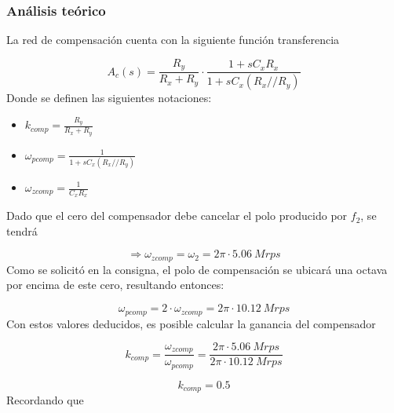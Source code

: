 \documentclass[a4paper,12pt]{article}
\begin{document}
\subsubsection{Análisis teórico}
\vspace{0.2cm}
\hspace{1mm}La red de compensaci\'on cuenta con la siguiente función transferencia 

\begin{equation}
    A_c(s) = \frac{R_y}{R_x + R_y} \cdot \frac{1 + sC_x R_x}{1 + sC_x (R_x // R_y)}
\end{equation}
\vspace{0.2cm}
\hspace{1mm}Donde se definen las siguientes notaciones:

\begin{itemize}
    \item $k_{comp}=\frac{R_y}{R_x + R_y}$
    \item $ \omega_{pcomp} =  \frac{1 }{1 + sC_x (R_x // R_y)}$
    \item $\omega_{zcomp} = \frac{1 }{ C_xR_x}$
\end{itemize}
\vspace{0.2cm}
\hspace{1mm}Dado que el cero del compensador debe cancelar el polo producido por $f_2$, se tendr\'a

\begin{equation}
    \Longrightarrow \omega_{zcomp} = \omega_2 = 2\pi \cdot 5.06~Mrps
\end{equation}
\vspace{0.2cm}
\hspace{1mm}Como se solicit\'o en la consigna, el polo de compensación se ubicar\'a una octava por encima de este cero, resultando entonces:

\begin{equation}
    \omega _{pcomp} = 2\cdot\omega _{zcomp} = 2\pi \cdot 10.12~Mrps 
\end{equation}
\vspace{0.2cm}
\hspace{1mm}Con estos valores deducidos, es posible calcular la ganancia del compensador

\begin{equation}
    k_{comp} = \frac{\omega_{zcomp}}{\omega _{pcomp}} = \frac{2\pi \cdot 5.06~Mrps}{2\pi \cdot 10.12~Mrps}
\end{equation}

\begin{equation}
    \boxed{
    k_{comp} = 0.5
    }
\end{equation}
\vspace{0.2cm}
\hspace{1mm}Recordando que
\end{document}
